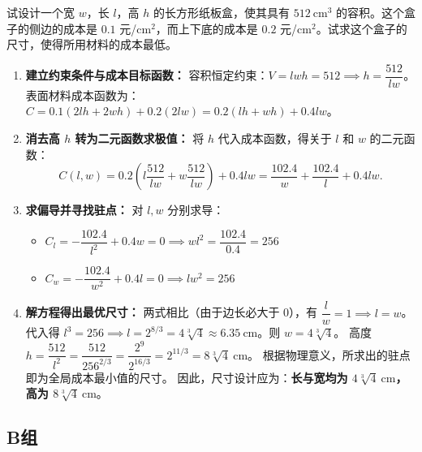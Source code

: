 \documentclass[lang=cn,11pt]{elegantbook}
\begin{document}
\begin{exercise}[实际问题中的条件最值]
试设计一个宽 $w$，长 $l$，高 $h$ 的长方形纸板盒，使其具有 $512\ \mathrm{cm}^3$ 的容积。这个盒子的侧边的成本是 $0.1$ 元/$\mathrm{cm}^2$，而上下底的成本是 $0.2$ 元/$\mathrm{cm}^2$。试求这个盒子的尺寸，使得所用材料的成本最低。
\end{exercise}
\begin{solution}
\begin{enumerate}
  \item \textbf{建立约束条件与成本目标函数：}
  容积恒定约束：$V = lwh = 512 \implies h = \dfrac{512}{lw}$。
  表面材料成本函数为：$C = 0.1(2lh + 2wh) + 0.2(2lw) = 0.2(lh+wh) + 0.4lw$。

  \item \textbf{消去高 $h$ 转为二元函数求极值：}
  将 $h$ 代入成本函数，得关于 $l$ 和 $w$ 的二元函数：
  \[ C(l,w) = 0.2\left(l\frac{512}{lw} + w\frac{512}{lw}\right) + 0.4lw = \frac{102.4}{w} + \frac{102.4}{l} + 0.4lw. \]

  \item \textbf{求偏导并寻找驻点：}
  对 $l, w$ 分别求导：
  \begin{itemize}
    \item $C_l = -\dfrac{102.4}{l^2} + 0.4w = 0 \implies wl^2 = \dfrac{102.4}{0.4} = 256$
    \item $C_w = -\dfrac{102.4}{w^2} + 0.4l = 0 \implies lw^2 = 256$
  \end{itemize}

  \item \textbf{解方程得出最优尺寸：}
  两式相比（由于边长必大于 0），有 $\dfrac{l}{w} = 1 \implies l=w$。
  代入得 $l^3 = 256 \implies l = 2^{8/3} = 4\sqrt[3]{4} \approx 6.35\ \mathrm{cm}$。则 $w = 4\sqrt[3]{4}$。
  高度 $h = \dfrac{512}{l^2} = \dfrac{512}{256^{2/3}} = \dfrac{2^9}{2^{16/3}} = 2^{11/3} = 8\sqrt[3]{4}\ \mathrm{cm}$。
  根据物理意义，所求出的驻点即为全局成本最小值的尺寸。
  因此，尺寸设计应为：\textbf{长与宽均为 $4\sqrt[3]{4}\ \mathrm{cm}$，高为 $8\sqrt[3]{4}\ \mathrm{cm}$}。
\end{enumerate}
\end{solution}

\subsection*{B组}
\end{document}
